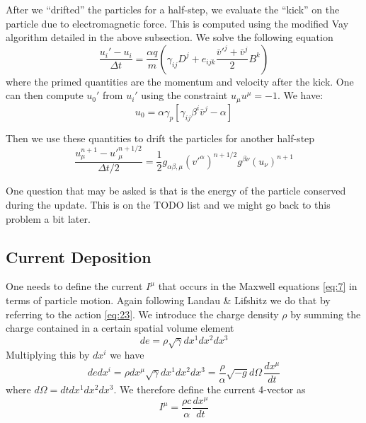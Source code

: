 After we ``drifted'' the particles for a half-step, we evaluate the ``kick'' on
the particle due to electromagnetic force. This is computed using the modified
Vay algorithm detailed in the above subsection. We solve the following equation
\begin{equation}
  \label{eq:57}
  \frac{u_i' - u_i}{\Delta t} = \frac{\alpha q}{m}\left( \gamma_{ij}D^j + e_{ijk}\frac{\bar{v}'^j + \bar{v}^j}{2}B^k \right)
\end{equation}
where the primed quantities are the momentum and velocity after the kick. One
can then compute $u_0'$ from $u_i'$ using the constraint $u_{\mu}u^{\mu} = -1$.
We have:
\begin{equation}
  \label{eq:59}
  u_0 = \alpha\gamma_p \left[ \gamma_{ij}\beta^i\bar{v}^j - \alpha \right]
\end{equation}

Then we use these quantities to drift the particles for another half-step
\begin{equation}
  \label{eq:58}
  \frac{u_{\mu}^{n+1} - u'^{n+1/2}_{\mu}}{\Delta t/2} = \frac{1}{2}g_{\alpha\beta,\mu}(v'^{\alpha})^{n+1/2}g^{\beta\nu}(u_{\nu})^{n+1}
\end{equation}

One question that may be asked is that is the energy of the particle conserved
during the update. This is on the TODO list and we might go back to this problem
a bit later.

\subsection{Current Deposition}
\label{sec:current}

One needs to define the current $I^{\mu}$ that occurs in the Maxwell equations
\eqref{eq:7} in terms of particle motion. Again following Landau \& Lifshitz we
do that by referring to the action \eqref{eq:23}. We introduce the charge
density $\rho$ by summing the charge contained in a certain spatial volume element
\begin{equation}
  \label{eq:32}
  de = \rho\sqrt{\gamma}dx^1dx^2dx^3
\end{equation}
Multiplying this by $dx^i$ we have
\begin{equation}
  \label{eq:32}
  de dx^i = \rho dx^\mu\sqrt{\gamma}dx^1dx^2dx^3 = \frac{\rho}{\alpha}\sqrt{-g}d\Omega\,\frac{dx^\mu}{dt}
\end{equation}
where $d\Omega = dtdx^1dx^2dx^3$. We therefore define the current 4-vector as
\begin{equation}
  \label{eq:33}
  I^{\mu} = \frac{\rho c}{\alpha}\frac{dx^{\mu}}{dt}
\end{equation}

